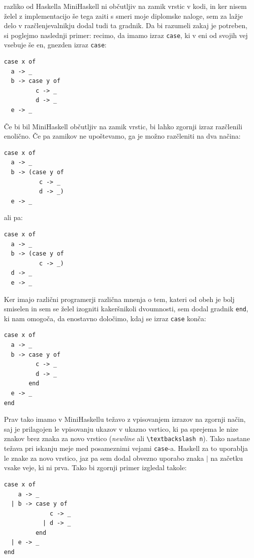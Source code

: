 \documentclass[a4paper,12pt,openright]{book}
\begin{document}
razliko od Haskella MiniHaskell ni občutljiv na zamik vrstic v kodi, in ker nisem želel z implementacijo še tega zaiti s smeri moje diplomske naloge, sem za lažje delo v razčlenjevalnikju 
dodal tudi ta gradnik. Da bi razumeli zakaj je potreben, si poglejmo naslednji primer: recimo, da imamo izraz \lstinline{case}, ki v eni od svojih vej vsebuje še en, gnezden izraz \lstinline{case}:
\begin{lstlisting}
case x of 
  a -> _
  b -> case y of
         c -> _
         d -> _
  e -> _
\end{lstlisting}
Če bi bil MiniHaskell občutljiv na zamik vrstic, bi lahko zgornji izraz razčlenili enolično. Če pa zamikov ne upoštevamo, ga je možno razčleniti na dva načina:
\begin{lstlisting}
case x of 
  a -> _
  b -> (case y of
          c -> _
          d -> _)
  e -> _
\end{lstlisting}
ali pa:
\begin{lstlisting}
case x of 
  a -> _
  b -> (case y of
          c -> _)
  d -> _
  e -> _
\end{lstlisting}
Ker imajo različni programerji različna mnenja o tem, kateri od obeh je bolj smiselen in sem se želel izogniti kakeršnikoli dvoumnosti, sem dodal 
gradnik \lstinline{end}, ki nam omogoča, da enostavno določimo, kdaj se izraz \lstinline{case} konča:
\begin{lstlisting}
case x of 
  a -> _
  b -> case y of
         c -> _
         d -> _
       end
  e -> _
end
\end{lstlisting}
Prav tako imamo v MiniHaskellu težavo z vpisovanjem izrazov na zgornji način, saj je prilagojen le vpisovanju ukazov v ukazno vsrtico, ki pa 
sprejema le nize znakov brez znaka za novo vrstico (\emph{newline} ali \lstinline{\textbackslash n}). Tako nastane težava pri iskanju meje med posameznimi vejami
\lstinline{case}-a. Haskell za to uporablja le znake za novo vrstico, jaz pa sem dodal obvezno uporabo znaka $\mid$ na začetku vsake veje, ki ni prva.
Tako bi zgornji primer izgledal takole:
\begin{lstlisting}
case x of 
    a -> _
  | b -> case y of
             c -> _
           | d -> _
         end
  | e -> _
end
\end{lstlisting}
\end{document}
